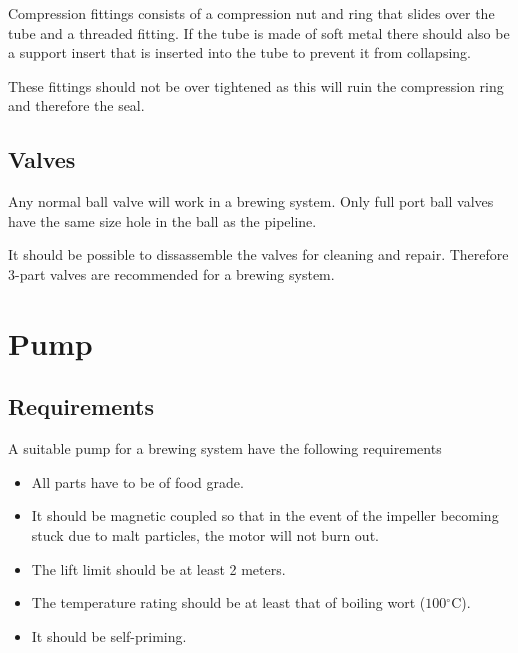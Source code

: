 \documentclass[11pt,fleqn]{book} %
\newcommand{\degree}{\ensuremath{^\circ}}
\begin{document}
Compression fittings consists of a compression nut and ring that slides over the tube and a threaded fitting. If the tube is made of soft metal there should also be a support insert that is inserted into the tube to prevent it from collapsing.

These fittings should not be over tightened as this will ruin the compression ring and therefore the seal.

\section{Valves}

Any normal ball valve will work in a brewing system. Only full port ball valves have the same size hole in the ball as the pipeline.

It should be possible to dissassemble the valves for cleaning and repair. Therefore 3-part valves are recommended for a brewing system.



\chapter{Pump}

\section{Requirements}

A suitable pump for a brewing system have the following requirements

\begin{itemize}
\item All parts have to be of food grade.
\item It should be magnetic coupled so that in the event of the impeller becoming stuck due to malt particles, the motor will not burn out.
\item The lift limit should be at least 2 meters.
\item The temperature rating should be at least that of boiling wort ($100\degree$C).
\item It should be self-priming.
\end{itemize}
\end{document}
